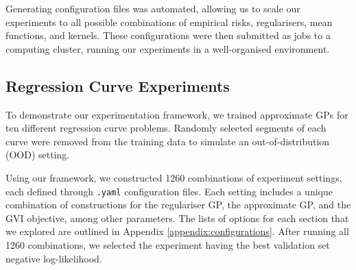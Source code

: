 \documentclass{article}
\def\code#1{\texttt{#1}}
\numberwithin{equation}{section}
\begin{document}
Generating configuration files was automated, allowing us to scale our experiments to all possible combinations of empirical risks, regularisers, mean functions, and kernels. 
These configurations were then submitted as jobs to a computing cluster, running our experiments in a well-organised environment.

\subsection{Regression Curve Experiments}
To demonstrate our experimentation framework, we trained approximate GPs for ten different regression curve problems. 
Randomly selected segments of each curve were removed from the training data to simulate an out-of-distribution (OOD) setting.

Using our framework, we constructed 1260 combinations of experiment settings, each defined through \code{.yaml} configuration files. 
Each setting includes a unique combination of constructions for the regulariser GP, the approximate GP, and the GVI objective, among other parameters. 
The lists of options for each section that we explored are outlined in Appendix \ref{appendix:configurations}.
After running all 1260 combinations, we selected the experiment having the best validation set negative log-likelihood. 
\end{document}
